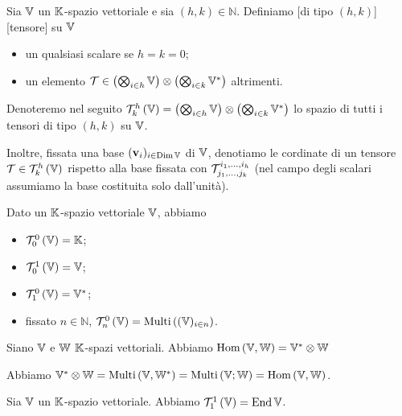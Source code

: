 \begin{Definition}
	Sia $\mathbb{V}$ un $\mathbb{K}$-spazio vettoriale e sia $(h,k) \in \mathbb{N}$. Definiamo [di tipo $(h,k)$][tensore] su $\mathbb{V}$
	\begin{itemize}
		\item un qualsiasi scalare se $h = k = 0$;
		\item un elemento $\mathcal{T} \in \left ( \bigotimes_{i \in h} \mathbb{V} \right ) \otimes \left ( \bigotimes_{i \in k} {{\mathbb{V}}^*} \right )$ altrimenti. 
	\end{itemize}
	Denoteremo nel seguito $\mathcal{T}^{h}_{k} \left ( \mathbb{V} \right ) = \left ( \bigotimes_{i \in h} \mathbb{V} \right ) \otimes \left ( \bigotimes_{i \in k} {{\mathbb{V}}^*} \right )$ lo spazio di tutti i tensori di tipo $(h,k)$ su $\mathbb{V}$.
	\par Inoltre, fissata una base $(\mathbf{v}_i)_{i \in \operatorname{\operatorname{Dim}}{\mathbb{V}}}$ di $\mathbb{V}$, denotiamo le cordinate di un tensore $\mathcal{T} \in \mathcal{T}^{h}_{k} \left ( \mathbb{V} \right )$ rispetto alla base fissata con $\mathcal{T}^{i_1,...,i_h}_{j_1,...,j_k}$ (nel campo degli scalari assumiamo la base costituita solo dall'unit\`a).
\end{Definition}
\begin{Example}
	Dato un $\mathbb{K}$-spazio vettoriale $\mathbb{V}$, abbiamo
	\begin{itemize}
		\item $\mathcal{T}^{0}_{0} \left ( \mathbb{V} \right ) = \mathbb{K}$;
		\item $\mathcal{T}^{1}_{0} \left ( \mathbb{V} \right ) = \mathbb{V}$;
		\item $\mathcal{T}^{0}_{1} \left ( \mathbb{V} \right ) = {{\mathbb{V}}^*}$;
		\item fissato $n \in \mathbb{N}$, $\mathcal{T}^{0}_{n} \left ( \mathbb{V} \right ) = \text{Multi}\left ( (\mathbb{V})_{i \in n} \right )$.
	\end{itemize}
\end{Example}
\begin{Lemma}
	Siano $\mathbb{V}$ e $\mathbb{W}$ $\mathbb{K}$-spazi vettoriali. Abbiamo $\text{Hom}\left ( \mathbb{V}, \mathbb{W} \right ) = {{\mathbb{V}}^*} \otimes \mathbb{W}$
\end{Lemma}
\Proof Abbiamo ${{\mathbb{V}}^*} \otimes \mathbb{W} = \text{Multi}\left ( \mathbb{V},{{\mathbb{W}}^*} \right ) = \text{Multi}\left ( \mathbb{V} ; \mathbb{W} \right ) = \text{Hom}\left ( \mathbb{V}, \mathbb{W} \right )$. \EndProof
\begin{Theorem}
	Sia $\mathbb{V}$ un $\mathbb{K}$-spazio vettoriale. Abbiamo $\mathcal{T}^{1}_{1} \left ( \mathbb{V} \right ) = \operatorname{End}{\mathbb{V}}$.
\end{Theorem}

